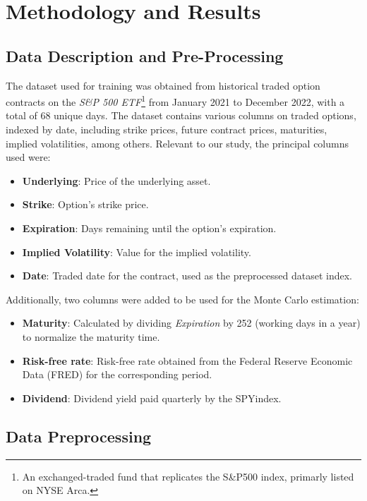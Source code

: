 \section{Methodology and Results}
\label{sec:methodology}

\subsection{Data Description and Pre-Processing}
\label{subsec:data}

The dataset used for training was obtained from historical traded option contracts on the \textit{S\&P 500 ETF}\footnote{
    An exchanged-traded fund that replicates the S\&P500 index, primarly listed on NYSE Arca.
}
from January 2021 to December 2022, with a total of 68 unique days.
The dataset contains various columns on traded options, indexed by date,
including strike prices, future contract prices, maturities, implied volatilities, among others.
Relevant to our study, the principal columns used were:
\begin{itemize}
    \item \textbf{Underlying}: Price of the underlying asset.
    \item \textbf{Strike}: Option's strike price.
    \item \textbf{Expiration}: Days remaining until the option's expiration.
    \item \textbf{Implied Volatility}: Value for the implied volatility.
    \item \textbf{Date}: Traded date for the contract, used as the preprocessed dataset index.
\end{itemize}

Additionally, two columns were added to be used for the Monte Carlo estimation:
\begin{itemize}
    \item \textbf{Maturity}: Calculated by dividing \textit{Expiration} by 252 (working days in a year) to normalize the maturity time.
    \item \textbf{Risk-free rate}: Risk-free rate obtained from the Federal Reserve Economic Data (FRED) for the corresponding period.
    \item \textbf{Dividend}: Dividend yield paid quarterly by the SPY\@ index.
\end{itemize}

\subsection{Data Preprocessing}
\label{subsec:preprocessing}

